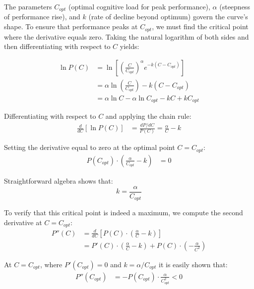 \documentclass{article}
\begin{document}
The parameters $C_{opt}$ (optimal cognitive load for peak performance), $\alpha$ (steepness of performance rise), and 
$k$ (rate of decline beyond optimum) govern the curve's shape. To ensure that performance peaks at $C_{opt}$, we 
must find the critical point where the derivative equals zero. Taking the natural logarithm of both sides and then 
differentiating with respect to $C$ yields:

\begin{align}
\ln P(C) &= \ln\left[\left(\frac{C}{C_{opt}}\right)^{\alpha}e^{-k (C - C_{opt})}\right] \\
&= \alpha \ln\left(\frac{C}{C_{opt}}\right) - k(C - C_{opt}) \\
&= \alpha \ln C - \alpha \ln C_{opt} - kC + kC_{opt}
\end{align}

Differentiating with respect to $C$ and applying the chain rule:
\begin{align}
\frac{d}{dC}[\ln P(C)] &= \frac{dP/dC}{P(C)} = \frac{\alpha}{C} - k
\end{align}

Setting the derivative equal to zero at the optimal point $C = C_{opt}$:
\begin{align}
P(C_{opt}) \cdot \left(\frac{\alpha}{C_{opt}} - k\right) &= 0
\end{align}

Straightforward algebra shows that:
\begin{equation}
    k = \frac{\alpha}{C_{opt}}
\end{equation}

To verify that this critical point is indeed a maximum, we compute the second derivative at $C = C_{opt}$:
\begin{align}
P''(C) &= \frac{d}{dC}\left[P(C) \cdot \left(\frac{\alpha}{C} - k\right)\right] \\
&= P'(C) \cdot \left(\frac{\alpha}{C} - k\right) + P(C) \cdot \left(-\frac{\alpha}{C^2}\right)
\end{align}

At $C = C_{opt}$, where $P'(C_{opt}) = 0$ and $k = \alpha/C_{opt}$ it is easily shown that:
\begin{align}
P''(C_{opt}) &= -P(C_{opt}) \cdot \frac{\alpha}{C_{opt}^2} < 0
\end{align}
\end{document}

